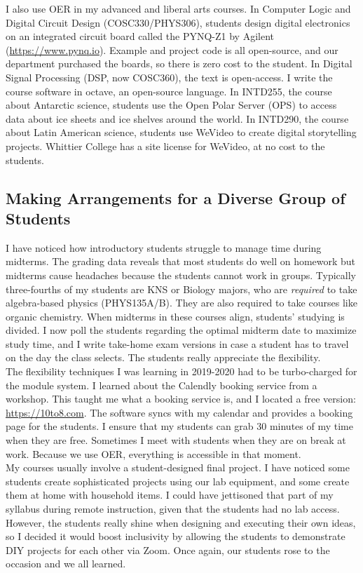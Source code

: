 \documentclass[../../../main.tex]{subfiles}
\begin{document}
I also use OER in my advanced and liberal arts courses.  In Computer Logic and Digital Circuit Design (COSC330/PHYS306), students design digital electronics on an integrated circuit board called the PYNQ-Z1 by Agilent (\url{https://www.pynq.io}).  Example and project code is all open-source, and our department purchased the boards, so there is zero cost to the student.  In Digital Signal Processing (DSP, now COSC360), the text is open-access.  I write the course software in octave, an open-source language.  In INTD255, the course about Antarctic science, students use the Open Polar Server (OPS) to access data about ice sheets and ice shelves around the world.  In INTD290, the course about Latin American science, students use WeVideo to create digital storytelling projects.  Whittier College has a site license for WeVideo, at no cost to the students.

\subsection{Making Arrangements for a Diverse Group of Students}
\label{sec:arrange}

I have noticed how introductory students struggle to manage time during midterms.  The grading data reveals that most students do well on homework but midterms cause headaches because the students cannot work in groups.  Typically three-fourths of my students are KNS or Biology majors, who are \textit{required} to take algebra-based physics (PHYS135A/B).  They are also required to take courses like organic chemistry.  When midterms in these courses align, students' studying is divided.  I now poll the students regarding the optimal midterm date to maximize study time, and I write take-home exam versions in case a student has to travel on the day the class selects.  The students really appreciate the flexibility.
\\
\vspace{0.15cm}
The flexibility techniques I was learning in 2019-2020 had to be turbo-charged for the module system.  I learned about the Calendly booking service from a workshop.  This taught me what a booking service is, and I located a free version: \url{https://10to8.com}.  The software syncs with my calendar and provides a booking page for the students.  I ensure that my students can grab 30 minutes of my time when they are free.  Sometimes I meet with students when they are on break at work.  Because we use OER, everything is accessible in that moment.
\\
\vspace{0.15cm}
My courses usually involve a student-designed final project.  I have noticed some students create sophisticated projects using our lab equipment, and some create them at home with household items.  I could have jettisoned that part of my syllabus during remote instruction, given that the students had no lab access.  However, the students really shine when designing and executing their own ideas, so I decided it would boost inclusivity by allowing the students to demonstrate DIY projects for each other via Zoom.  Once again, our students rose to the occasion and we all learned.
\end{document}
